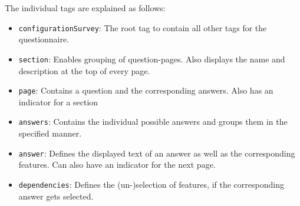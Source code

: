 The individual tags are explained as follows:

\begin{itemize}
\item \texttt{configurationSurvey}: The root tag to contain all other tags for the questionnaire.
\item \texttt{section}: Enables grouping of question-pages. Also displays the name and description at the top of every page.
\item \texttt{page}: Contains a question and the corresponding answers. Also has an indicator for a section
\item \texttt{answers}: Contains the individual possible answers and groups them in the specified manner.
\item \texttt{answer}: Defines the displayed text of an answer as well as the corresponding features. Can also have an indicator for the next page.
\item \texttt{dependencies}: Defines the (un-)selection of features, if the corresponding answer gets selected.
\end{itemize}

